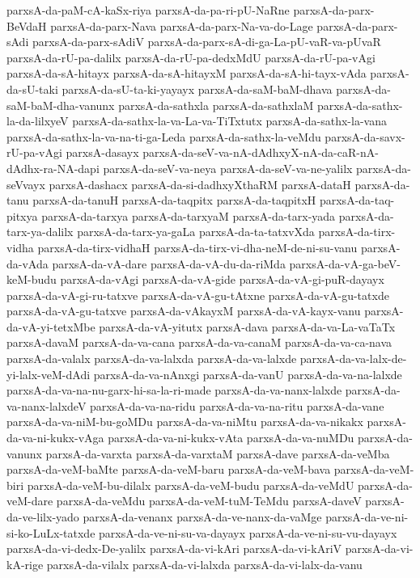 {parxsA-da-paM-cA-kaSx-riya
parxsA-da-pa-ri-pU-NaRne
parxsA-da-parx-BeVdaH
parxsA-da-parx-Nava
parxsA-da-parx-Na-va-do-Lage
parxsA-da-parx-sAdi
parxsA-da-parx-sAdiV
parxsA-da-parx-sA-di-ga-La-pU-vaR-va-pUvaR
parxsA-da-rU-pa-dalilx
parxsA-da-rU-pa-dedxMdU
parxsA-da-rU-pa-vAgi
parxsA-da-sA-hitayx
parxsA-da-sA-hitayxM
parxsA-da-sA-hi-tayx-vAda
parxsA-da-sU-taki
parxsA-da-sU-ta-ki-yayayx
parxsA-da-saM-baM-dhava
parxsA-da-saM-baM-dha-vanunx
parxsA-da-sathxla
parxsA-da-sathxlaM
parxsA-da-sathx-la-da-lilxyeV
parxsA-da-sathx-la-va-La-va-TiTxtutx
parxsA-da-sathx-la-vana
parxsA-da-sathx-la-va-na-ti-ga-Leda
parxsA-da-sathx-la-veMdu
parxsA-da-savx-rU-pa-vAgi
parxsA-dasayx
parxsA-da-seV-va-nA-dAdhxyX-nA-da-caR-nA-dAdhx-ra-NA-dapi
parxsA-da-seV-va-neya
parxsA-da-seV-va-ne-yalilx
parxsA-da-seVvayx
parxsA-dashacx
parxsA-da-si-dadhxyXthaRM
parxsA-dataH
parxsA-da-tanu
parxsA-da-tanuH
parxsA-da-taqpitx
parxsA-da-taqpitxH
parxsA-da-taq-pitxya
parxsA-da-tarxya
parxsA-da-tarxyaM
parxsA-da-tarx-yada
parxsA-da-tarx-ya-dalilx
parxsA-da-tarx-ya-gaLa
parxsA-da-ta-tatxvXda
parxsA-da-tirx-vidha
parxsA-da-tirx-vidhaH
parxsA-da-tirx-vi-dha-neM-de-ni-su-vanu
parxsA-da-vAda
parxsA-da-vA-dare
parxsA-da-vA-du-da-riMda
parxsA-da-vA-ga-beV-keM-budu
parxsA-da-vAgi
parxsA-da-vA-gide
parxsA-da-vA-gi-puR-dayayx
parxsA-da-vA-gi-ru-tatxve
parxsA-da-vA-gu-tAtxne
parxsA-da-vA-gu-tatxde
parxsA-da-vA-gu-tatxve
parxsA-da-vAkayxM
parxsA-da-vA-kayx-vanu
parxsA-da-vA-yi-tetxMbe
parxsA-da-vA-yitutx
parxsA-dava
parxsA-da-va-La-vaTaTx
parxsA-davaM
parxsA-da-va-cana
parxsA-da-va-canaM
parxsA-da-va-ca-nava
parxsA-da-valalx
parxsA-da-va-lalxda
parxsA-da-va-lalxde
parxsA-da-va-lalx-de-yi-lalx-veM-dAdi
parxsA-da-va-nAnxgi
parxsA-da-vanU
parxsA-da-va-na-lalxde
parxsA-da-va-na-nu-garx-hi-sa-la-ri-made
parxsA-da-va-nanx-lalxde
parxsA-da-va-nanx-lalxdeV
parxsA-da-va-na-ridu
parxsA-da-va-na-ritu
parxsA-da-vane
parxsA-da-va-niM-bu-goMDu
parxsA-da-va-niMtu
parxsA-da-va-nikakx
parxsA-da-va-ni-kukx-vAga
parxsA-da-va-ni-kukx-vAta
parxsA-da-va-nuMDu
parxsA-da-vanunx
parxsA-da-varxta
parxsA-da-varxtaM
parxsA-dave
parxsA-da-veMba
parxsA-da-veM-baMte
parxsA-da-veM-baru
parxsA-da-veM-bava
parxsA-da-veM-biri
parxsA-da-veM-bu-dilalx
parxsA-da-veM-budu
parxsA-da-veMdU
parxsA-da-veM-dare
parxsA-da-veMdu
parxsA-da-veM-tuM-TeMdu
parxsA-daveV
parxsA-da-ve-lilx-yado
parxsA-da-venanx
parxsA-da-ve-nanx-da-vaMge
parxsA-da-ve-ni-si-ko-LuLx-tatxde
parxsA-da-ve-ni-su-va-dayayx
parxsA-da-ve-ni-su-vu-dayayx
parxsA-da-vi-dedx-De-yalilx
parxsA-da-vi-kAri
parxsA-da-vi-kAriV
parxsA-da-vi-kA-rige
parxsA-da-vilalx
parxsA-da-vi-lalxda
parxsA-da-vi-lalx-da-vanu
}
